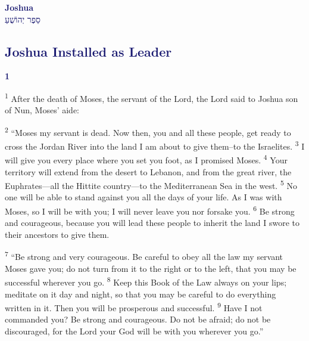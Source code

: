 \documentclass[12pt,twoside]{article}
\newcommand{\vs}[1]{\textsuperscript{#1}}
\begin{document}
\begin{center}
{\textcolor{MidnightBlue}{\fontsize{40pt}{48pt}\selectfont \textbf{Joshua}}}\\
\vspace{0.5cm}
{\Huge \textcolor{MidnightBlue}{סֵפֶר יְהוֹשֻׁעַ}}
\vspace{-1cm}
\end{center}
\thispagestyle{fancy}



\textcolor{MidnightBlue}{\subsection*{\textbf{Joshua Installed as Leader}}}
\noindent
\begin{minipage}[t]{1.5cm}
  \vspace{-0.4\baselineskip} %
  {\textcolor{MidnightBlue}{\fontsize{40pt}{48pt}\selectfont \textbf{1}}}
\end{minipage}%
\hspace{-0.3cm}%
\begin{minipage}[t]{\dimexpr\linewidth - 1.5cm - 0.5cm\relax}
    \vs{1} After the death of Moses, the servant of the Lord, the Lord said to Joshua son of Nun, Moses' aide:
\end{minipage}

\hspace*{15pt}
\vs{2} ``Moses my servant is dead. Now then, you and all these people, get ready to cross the Jordan River into the land I am about to give them--to the Israelites.
\vs{3} I will give you every place where you set you foot, as I promised Moses.
\vs{4} Your territory will extend from the desert to Lebanon, and from the great river, the Euphrates---all the Hittite country---to the Mediterranean Sea in the west.
\vs{5} No one will be able to stand against you all the days of your life. As I was with Moses, so I will be with you; I will never leave you nor forsake you.
\vs{6} Be strong and courageous, because you will lead these people to inherit the land I swore to their ancestors to give them.

\vs{7} ``Be strong and very courageous. Be careful to obey all the law my servant Moses gave you; do not turn from it to the right or to the left, that you may be successful wherever you go.
\vs{8} Keep this Book of the Law always on your lips; meditate on it day and night, so that you may be careful to do everything written in it. Then you will be prosperous and successful.
\vs{9} Have I not commanded you? Be strong and courageous. Do not be afraid; do not be discouraged, for the Lord your God will be with you wherever you go.''
\end{document}

